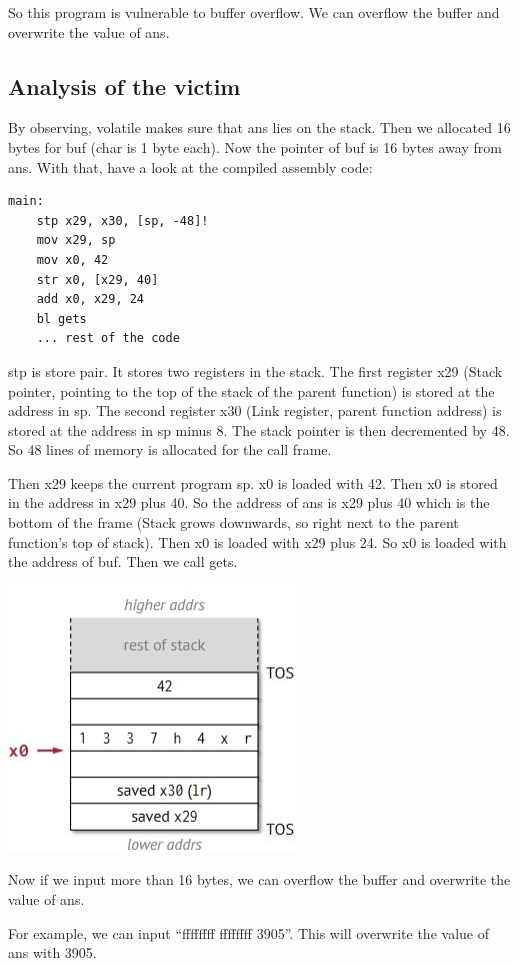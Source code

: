 \documentclass[letterpaper,12pt]{article}
\begin{document}
So this program is vulnerable to buffer overflow. We can overflow the buffer
and overwrite the value of ans.
\subsection{Analysis of the victim}
By observing, volatile makes sure that ans lies on the stack. Then we allocated
16 bytes for buf (char is 1 byte each). Now the pointer of buf is 16 bytes away
from ans. With that, have a look at the compiled assembly code:
\begin{lstlisting}
main:
    stp x29, x30, [sp, -48]!
    mov x29, sp
    mov x0, 42
    str x0, [x29, 40]
    add x0, x29, 24
    bl gets
    ... rest of the code 
\end{lstlisting}
stp is store pair. It stores two registers in the stack. The first register x29
(Stack pointer, pointing to the top of the stack of the parent function) is
stored at the address in sp. The second register x30 (Link register, parent
function address) is stored at the address in sp minus 8. The stack pointer is
then decremented by 48. So 48 lines of memory is allocated for the call frame.

Then x29 keeps the current program sp. x0 is loaded with 42. Then x0 is stored
in the address in x29 plus 40. So the address of ans is x29 plus 40 which is
the bottom of the frame (Stack grows downwards, so right next to the parent
function's top of stack). Then x0 is loaded with x29 plus 24. So x0 is loaded
with the address of buf. Then we call gets.

\includegraphics*{./Images/Haxx victim stack.jpg}

Now if we input more than 16 bytes, we can overflow the buffer and overwrite
the value of ans.

For example, we can input ``ffffffff ffffffff 3905''. This will overwrite the
value of ans with 3905.
\end{document}
